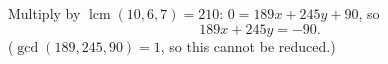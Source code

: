 Multiply by $\operatorname{lcm}(10,6,7)=210$: $0=189x+245y+90$, so
\[
\boxed{189x+245y=-90}.
\]
($\gcd(189,245,90)=1$, so this cannot be reduced.)
